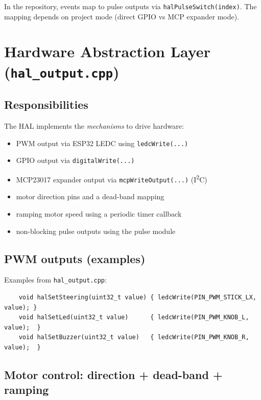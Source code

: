 In the repository, events map to pulse outputs via \texttt{halPulseSwitch(index)}. The mapping depends on
project mode (direct GPIO vs MCP expander mode).

\section{Hardware Abstraction Layer (\texttt{hal\_output.cpp})}
\label{sec:control-hal-hal-layer}

\subsection{Responsibilities}
\label{subsec:control-hal-hal-resp}

The HAL implements the \emph{mechanisms} to drive hardware:

\begin{itemize}
    \item PWM output via ESP32 LEDC using \texttt{ledcWrite(...)}
    \item GPIO output via \texttt{digitalWrite(...)}
    \item MCP23017 expander output via \texttt{mcpWriteOutput(...)} (I\textsuperscript{2}C)
    \item motor direction pins and a dead-band mapping
    \item ramping motor speed using a periodic timer callback
    \item non-blocking pulse outputs using the pulse module
\end{itemize}

\subsection{PWM outputs (examples)}
\label{subsec:control-hal-hal-pwm}

Examples from \texttt{hal\_output.cpp}:

\begin{verbatim}
    void halSetSteering(uint32_t value) { ledcWrite(PIN_PWM_STICK_LX, value); }
    void halSetLed(uint32_t value)      { ledcWrite(PIN_PWM_KNOB_L, value);  }
    void halSetBuzzer(uint32_t value)   { ledcWrite(PIN_PWM_KNOB_R, value);  }
\end{verbatim}

\subsection{Motor control: direction + dead-band + ramping}
\label{subsec:control-hal-hal-motors}

